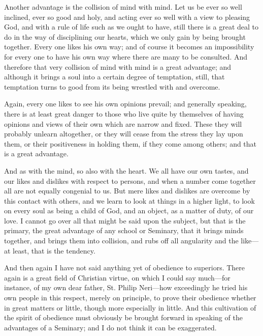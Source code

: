 Another advantage is the collision of mind with mind. Let us be
ever so well inclined, ever so good and holy, and acting ever so well
with a view to pleasing God, and with a rule of life such as we ought
to have, still there is a great deal to do in the way of disciplining
our hearts, which we only gain by being brought together. Every one
likes his own way; and of course it becomes an impossibility for every
one to have his own way where there are many to be consulted. And
therefore that very collision of mind with mind is a great advantage;
and although it brings a soul into a certain degree of temptation,
still, that temptation turns to good from its being wrestled with and
overcome.

Again, every one likes to see his own opinions prevail; and
generally speaking, there is at least great danger to those who live
quite by themselves of having opinions and views of their own which
are narrow and fixed. These they will probably unlearn altogether, or
they will cease from the stress they lay upon them, or their
positiveness in holding them, if they come among others; and that is a
great advantage.

And as with the mind, so also with the heart. We all have our own
tastes, and our likes and dislikes with respect to persons, and when a
number come together all are not equally congenial to us. But mere
likes and dislikes are overcome by this contact with others, and we
learn to look at things in a higher light, to look on every soul as
being a child of God, and an object, as a matter of duty, of our love.
I cannot go over all that might be said upon the subject, but that is
the primary, the great advantage of any school or Seminary, that it
brings minds together, and brings them into collision, and rubs off
all angularity and the like—at least, that is the tendency.

And then again I have not said anything yet of obedience to
superiors. There again is a great field of Christian virtue, on which
I could say much—for instance, of my own dear father, St. Philip
Neri—how exceedingly he tried his own people in this respect, merely
on principle, to prove their obedience whether in great matters
or little, though more especially in little. And this cultivation of
the spirit of obedience must obviously be brought forward in speaking
of the advantages of a Seminary; and I do not think it can be
exaggerated.

